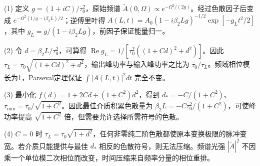 (1) 定义 \(g=(1+iC)/\tau_0^2\)，原始频谱 \(\widetilde A(0,\Omega)\propto e^{-\Omega^2/(2g)}\)。经过色散因子后变成 \(e^{-\Omega^2(1/g-i\beta_2L)/2}\)；逆傅里叶得 \(A(L,t)=A_0(1-i\beta_2Lg)^{-1/2}\exp[-g_Lt^2/2]\)，其中 \(\boxed{g_L=g/(1-i\beta_2Lg)}\)，前因子保证能量归一。

(2) 令 \(d=\beta_2L/\tau_0^2\)，可算得 \(\operatorname{Re}g_L=1/[\tau_0^2((1+Cd)^2+d^2)]\)。因此 \(\boxed{\tau_L=\tau_0\sqrt{(1+Cd)^2+d^2}}\)，输出峰功率与输入峰功率之比为 \(\tau_0/\tau_L\)。频域相位模长为1，Parseval定理保证 \(\int|A(L,t)|^2dt\) 完全不变。

(3) 最小化 \(f(d)=1+2Cd+(1+C^2)d^2\)，得到 \(\boxed{d_*=-C/(1+C^2)}\)、\(\boxed{\tau_{\min}=\tau_0/\sqrt{1+C^2}}\)。因此最佳介质积累色散量为 \(\beta_2L=-C\tau_0^2/(1+C^2)\)，可使峰功率提高 \(\sqrt{1+C^2}\) 倍，但需要允许选择所需符号的色散。

(4) \(C=0\) 时 \(\tau_L=\tau_0\sqrt{1+d^2}\)，任何非零纯二阶色散都使原本变换极限的脉冲变宽。若介质只能提供与最佳 \(d_*\) 相反的色散符号，则无法压缩。频谱光强 \(|\widetilde A|^2\) 不因乘一个单位模二次相位而改变，时间压缩来自频率分量的相位重排。
